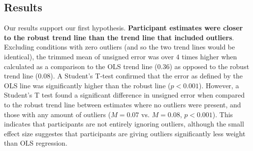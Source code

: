 \documentclass{sigchi}
\begin{document}
\subsection{Results}

Our results support our first hypothesis. \textbf{Participant estimates were closer to the robust trend line than the trend line that included outliers}. Excluding conditions with zero outliers (and so the two trend lines would be identical), the trimmed mean of unsigned error was over $4$ times higher when calculated as a comparison to the OLS trend line ($0.36$) as opposed to the robust trend line ($0.08$). A Student's T-test confirmed that the error as defined by the OLS line was significantly higher than the robust line ($p<0.001$). However, a Student's T test found a significant difference in unsigned error when compared to the robust trend line between estimates where no outliers were present, and those with any amount of outliers ($M=0.07$ vs. $M=0.08$, $p<0.001$). This indicates that participants are not entirely ignoring outliers, although the small effect size suggestes that participants are giving outliers significantly less weight than OLS regression. 


\end{document}
